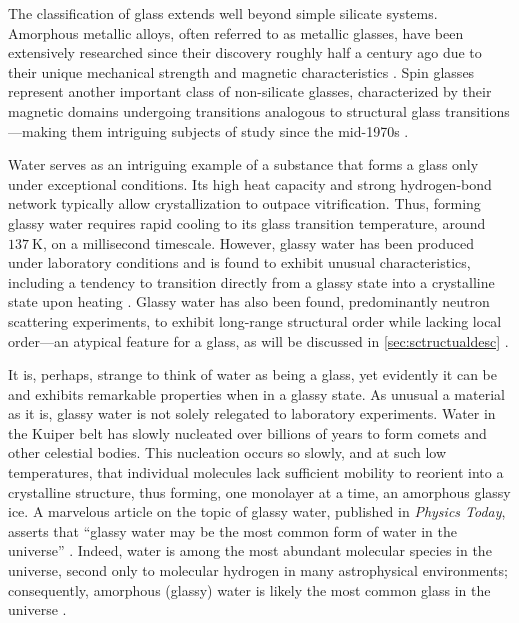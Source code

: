 The classification of glass extends well beyond simple silicate systems. Amorphous metallic alloys, often referred to as metallic glasses, have been extensively researched since their discovery roughly half a century ago due to their unique mechanical strength and magnetic characteristics \nolinebreak \cite{Greer1947,Ashby}.  Spin glasses represent another important class of non-silicate glasses, characterized by their magnetic domains undergoing transitions analogous to structural glass transitions—making them intriguing subjects of study since the mid-1970s \nolinebreak \cite{RevModPhys.58.801,Mydosh,PhysRevLett.35.1792}.

Water serves as an intriguing example of a substance that forms a glass only under exceptional conditions. Its high heat capacity and strong hydrogen-bond network typically allow crystallization to outpace vitrification. Thus, forming glassy water requires rapid cooling to its glass transition temperature, around $137~\si{\kelvin}$, on a millisecond timescale. However, glassy water has been produced under laboratory conditions and is found to exhibit unusual characteristics, including a tendency to transition directly from a glassy state into a crystalline state upon heating \nolinebreak \cite{Angell2}. Glassy water has also been found, predominantly \via neutron scattering experiments, to exhibit long-range structural order while lacking local order—an atypical feature for a glass, as will be discussed in \sect \nolinebreak \ref{sec:sctructualdesc} \nolinebreak \cite{Martelli,Bradley}.  

It is, perhaps, strange to think of water as being a glass, yet evidently it can be and exhibits remarkable properties when in a glassy state. As unusual a material as it is, glassy water is not solely relegated to laboratory experiments. Water in the Kuiper belt has slowly nucleated over billions of years to form comets and other celestial bodies. This nucleation occurs so slowly, and at such low temperatures, that individual molecules lack sufficient mobility to reorient into a crystalline structure, thus forming, one monolayer at a time, an amorphous glassy ice. A marvelous article on the topic of glassy water, published in \emph{Physics Today}, asserts that “glassy water may be the most common form of water in the universe” \nolinebreak \cite{Debenedetti2}. Indeed, water is among the most abundant molecular species in the universe, second only to molecular hydrogen in many astrophysical environments; consequently, amorphous (glassy) water is likely the most common glass in the universe \cite{Herbst2009,Fraser2001}.

